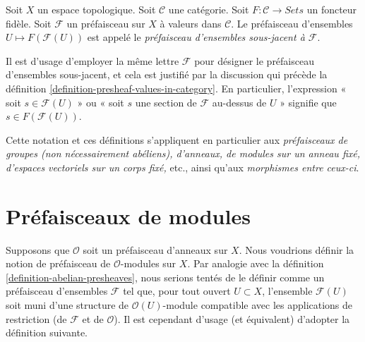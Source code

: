 \begin{definition}
\label{definition-underlying-presheaf-sets}
Soit $X$ un espace topologique. Soit $\mathcal{C}$ une catégorie.
Soit $F : \mathcal{C} \to \textit{Sets}$ un foncteur fidèle.
Soit $\mathcal{F}$ un préfaisceau sur $X$ à valeurs dans $\mathcal{C}$.
Le préfaisceau d'ensembles $U \mapsto F(\mathcal{F}(U))$
est appelé le {\it préfaisceau d'ensembles sous-jacent à $\mathcal{F}$}.
\end{definition}

\noindent
Il est d'usage d'employer la même lettre $\mathcal{F}$ pour désigner
le préfaisceau d'ensembles sous-jacent, et cela est
justifié par la discussion qui précède la
définition \ref{definition-presheaf-values-in-category}.
En particulier, l'expression « soit $s \in \mathcal{F}(U)$ »
ou « soit $s$ une section de $\mathcal{F}$ au-dessus de $U$ » signifie
que $s \in F(\mathcal{F}(U))$.

\medskip\noindent
Cette notation et ces définitions s'appliquent en particulier aux
{\it préfaisceaux de groupes (non nécessairement abéliens), d'anneaux, de modules
sur un anneau fixé, d'espaces vectoriels sur un corps fixé, } etc., ainsi qu'aux
{\it morphismes entre ceux-ci}.

\section{Préfaisceaux de modules}
\label{section-presheaves-modules}

\noindent
Supposons que $\mathcal{O}$ soit un préfaisceau d'anneaux sur $X$.
Nous voudrions définir la notion de préfaisceau de
$\mathcal{O}$-modules sur $X$. Par analogie avec la définition
\ref{definition-abelian-presheaves}, nous serions tentés de le définir
comme un préfaisceau d'ensembles $\mathcal{F}$ tel que, pour tout ouvert
$U \subset X$, l'ensemble $\mathcal{F}(U)$ soit muni d'une structure
de $\mathcal{O}(U)$-module compatible avec les applications de restriction
(de $\mathcal{F}$ et de $\mathcal{O}$). Il est cependant d'usage
(et équivalent) d'adopter la définition suivante.

